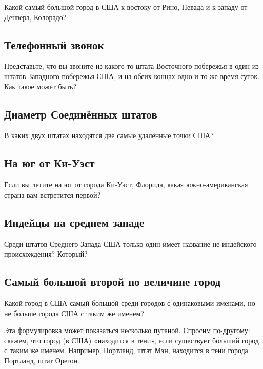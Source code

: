 Какой самый большой город в США к востоку от Рино, Невада  и к западу от Денвера, Колорадо?


\subsection*{Телефонный звонок}%


Представьте, что вы звоните из какого-то штата Восточного побережья в один из штатов Западного побережья США, и на обеих концах одно и то же время суток. Как такое может быть?  
 


\subsection*{Диаметр Соединённых штатов}%


В каких двух штатах находятся две самые удалённые точки США?  
       


\subsection*{На юг от Ки-Уэст}%


Если вы летите на юг от города Ки-Уэст, Флорида, какая южно-американская страна вам 
встретится первой?     

\subsection*{Индейцы на среднем западе}%


Среди  штатов Среднего Запада США только один имеет название не индейского происхождения?  Который?    




\subsection*{Самый большой второй по величине город}%


Какой город  в США самый большой среди городов с одинаковыми именами, но  не больше города США с таким же именем?

\medskip

Эта формулировка может показаться несколько путаной. Спросим по-другому: скажем, что город (в США) «находится в тени», если существует б\'{о}льший город с таким же именем. Например,
Портланд, штат Мэн,  находится в тени города Портланд, штат Орегон.


